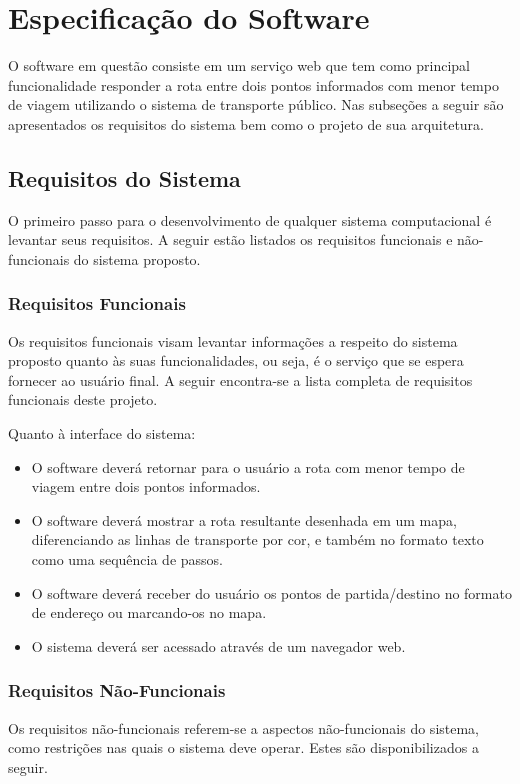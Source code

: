 
\chapter{Especificação do Software}
\label{specs}
O software em questão consiste em um serviço web que tem como principal funcionalidade responder a rota entre dois pontos informados com menor tempo de viagem utilizando o sistema de transporte público. 
Nas subseções a seguir são apresentados os requisitos do sistema bem como o projeto de sua arquitetura.

\section{Requisitos do Sistema}
O primeiro passo para o desenvolvimento de qualquer sistema computacional é levantar seus requisitos. 
A seguir estão listados os requisitos funcionais e não-funcionais do sistema proposto.

\subsection{Requisitos Funcionais}
Os requisitos funcionais visam levantar informações a respeito do sistema proposto quanto às suas funcionalidades, ou seja, é o serviço que se espera fornecer ao usuário final.
A seguir encontra-se a lista completa de requisitos funcionais deste projeto. 

Quanto à interface do sistema:
\begin{itemize}
	\item O software deverá retornar para o usuário a rota com menor tempo de viagem entre dois pontos informados.
	\item O software deverá mostrar a rota resultante desenhada em um mapa, diferenciando as linhas de transporte por cor, e também no formato texto como uma sequência de passos.
	\item O software deverá receber do usuário os pontos de partida/destino no formato de endereço ou marcando-os no mapa.
	\item O sistema deverá ser acessado através de um navegador web.
\end{itemize}

\subsection{Requisitos Não-Funcionais}
Os requisitos não-funcionais referem-se a aspectos não-funcionais do sistema, como restrições nas quais o sistema deve operar.
Estes são disponibilizados a seguir.

